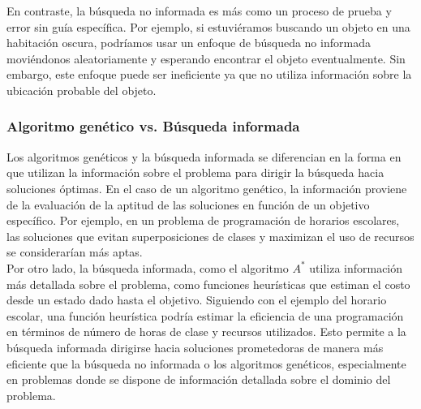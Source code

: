 En contraste, la búsqueda no informada es más como un proceso de prueba y error sin guía 
específica. Por ejemplo, si estuviéramos buscando un objeto en una habitación oscura, 
podríamos usar un enfoque de búsqueda no informada moviéndonos aleatoriamente y esperando 
encontrar el objeto eventualmente. Sin embargo, este enfoque puede ser ineficiente ya que 
no utiliza información sobre la ubicación probable del objeto.


\subsubsection*{Algoritmo genético vs. Búsqueda informada}

Los algoritmos genéticos y la búsqueda informada se diferencian en la forma en que 
utilizan la información sobre el problema para dirigir la búsqueda hacia soluciones 
óptimas. En el caso de un algoritmo genético, la información proviene de la evaluación de 
la aptitud de las soluciones en función de un objetivo específico. Por ejemplo, en un 
problema de programación de horarios escolares, las soluciones que evitan superposiciones 
de clases y maximizan el uso de recursos se considerarían más aptas.\\ 

Por otro lado, la búsqueda informada, como el algoritmo $A^{*}$ utiliza información más 
detallada sobre el problema, como funciones heurísticas que estiman el costo desde un 
estado dado hasta el objetivo. Siguiendo con el ejemplo del horario escolar, una función 
heurística podría estimar la eficiencia de una programación en términos de número de horas 
de clase y recursos utilizados. Esto permite a la búsqueda informada dirigirse hacia 
soluciones prometedoras de manera más eficiente que la búsqueda no informada o los 
algoritmos genéticos, especialmente en problemas donde se dispone de información detallada 
sobre el dominio del problema.



